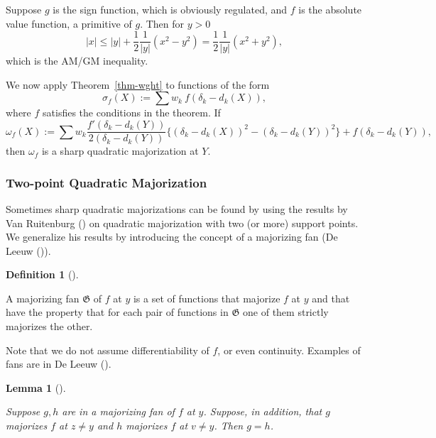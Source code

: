 \documentclass[
  12pt,
  letterpaper,
  DIV=11,
  numbers=noendperiod]{scrartcl}
\theoremstyle{plain}
\theoremstyle{plain}
\newtheorem{lemma}{Lemma}[section]
\theoremstyle{plain}
\theoremstyle{definition}
\newtheorem{definition}{Definition}[section]
\theoremstyle{remark}
\begin{document}
Suppose \(g\) is the sign function, which is obviously regulated, and
\(f\) is the absolute value function, a primitive of \(g\). Then for
\(y>0\) \[
|x|\leq|y|+\frac12\frac{1}{|y|}(x^2-y^2)=\frac12\frac{1}{|y|}(x^2+y^2),
\] which is the AM/GM inequality.

We now apply Theorem~\ref{thm-wght} to functions of the form
\begin{equation}
\sigma_f(X):=\sum w_k\ f(\delta_k-d_k(X)),\label{eq:fstressdef}
\end{equation} where \(f\) satisfies the conditions in the theorem. If
\begin{equation}
\omega_f(X):=\sum w_k\frac{f'(\delta_k-d_k(Y))}{2(\delta_k-d_k(Y))}\{(\delta_k-d_k(X))^2-(\delta_k-d_k(Y))^2\}+f(\delta_k-d_k(Y)),\label{eq:fstressmaj}
\end{equation} then \(\omega_f\) is a sharp quadratic majorization at
\(Y\).

\subsubsection{Two-point Quadratic
Majorization}\label{two-point-quadratic-majorization}

Sometimes sharp quadratic majorizations can be found by using the
results by Van Ruitenburg () on
quadratic majorization with two (or more) support points. We generalize
his results by introducing the concept of a majorizing fan (De Leeuw
()).

\begin{definition}[]\protect\hypertarget{def-fan}{}\label{def-fan}

A majorizing fan \(\mathfrak{G}\) of \(f\) at \(y\) is a set of
functions that majorize \(f\) at \(y\) and that have the property that
for each pair of functions in \(\mathfrak{G}\) one of them strictly
majorizes the other.

\end{definition}

Note that we do not assume differentiability of \(f\), or even
continuity. Examples of fans are in De Leeuw
().

\begin{lemma}[]\protect\hypertarget{lem-first}{}\label{lem-first}

Suppose \(g,h\) are in a majorizing fan of \(f\) at \(y\). Suppose, in
addition, that \(g\) majorizes \(f\) at \(z\not=y\) and \(h\) majorizes
\(f\) at \(v\not= y\). Then \(g=h\).

\end{lemma}
\end{document}
